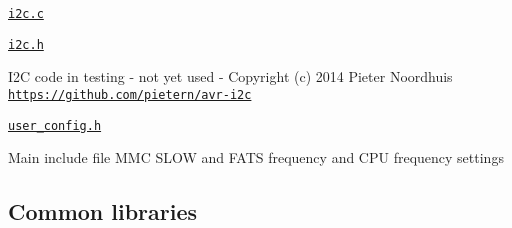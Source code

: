 \begin{DoxyItemize}
\begin{DoxyItemize}
\item \href{hardware/i2c.c}{\tt i2c.\+c}
\item \href{hardware/i2c.h}{\tt i2c.\+h}
\begin{DoxyItemize}
\item I2C code in testing -\/ not yet used -\/ Copyright (c) 2014 Pieter Noordhuis \href{https://github.com/pietern/avr-i2c}{\tt https\+://github.\+com/pietern/avr-\/i2c}
\end{DoxyItemize}
\item \href{hardware/user_config.h}{\tt user\+\_\+config.\+h}
\begin{DoxyItemize}
\item Main include file M\+MC S\+L\+OW and F\+A\+TS frequency and C\+PU frequency settings
\end{DoxyItemize}
\end{DoxyItemize}
\end{DoxyItemize}

\subsection*{Common libraries}


